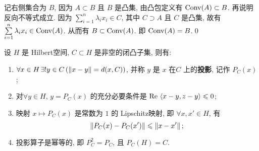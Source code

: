 	\begin{Proof}
		记右侧集合为 $ B $, 因为 $ A\subset B $ 且 $ B $ 是凸集, 由凸包定义有 $ \operatorname{Conv}(A)\subset B $. 再说明反向不等式成立. 因为 $ \sum\limits_{i=1}^{n}\lambda_{i}x_{i}\in C $, 其中 $ C\supset A $ 且 $ C $ 是凸集, 故有 $ \sum\limits_{i=1}^{n}\lambda_{i}x_{i}\in\operatorname{Conv}(A) $. 从而有 $ B\subset\operatorname{Conv}(A) $. 即 $ \operatorname{Conv}(A)=B $.\qed
	\end{Proof}

	\begin{Theorem}[闭凸集投影定理]
		设 $ H $ 是 Hilbert空间, $ C\subset H $ 是非空的闭凸子集, 则有:
		\begin{enumerate}[(1)]
			\item $ \forall x\in H\,\exists!y\in C\,(\left\| x-y \right\|=d(x, C)) $, 并称 $ y $ 是 $ x $ 在$ C $ 上的\textbf{投影}, 记作 $ P_{C}(x) $;
			\item 对$ \forall y\in H $, $ y=P_{C}(x) $ 的充分必要条件是 $ \mathrm{Re\,}\left\langle x-y, z-y \right\rangle\leqslant0 $;
			\item 映射 $ x\mapsto P_{C}(x) $ 是常数为 $ 1 $ 的 Lipschitz映射, 即 $ \forall x, x'\in H $, 有
			\[
				\left\| P_{C}(x)-P_{C}(x') \right\|\leqslant \left\| x-x' \right\|;
			\]
			\item 投影算子是幂等的, 即 $ P^{2}_{C}=P_{C} $, 且 $ P_{C}(H)=C $. 
		\end{enumerate}
	\end{Theorem}
	
